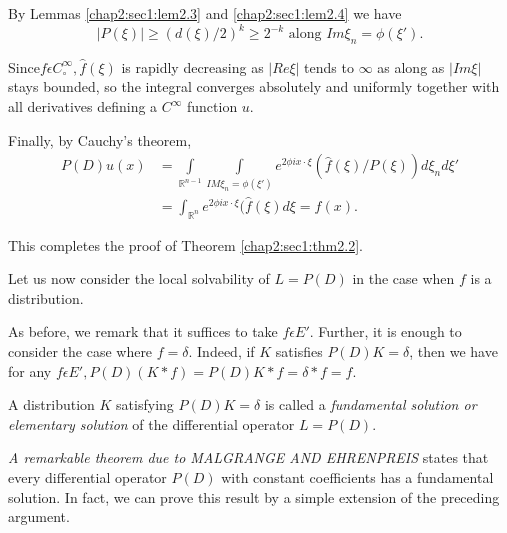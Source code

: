 By Lemmas \ref{chap2:sec1:lem2.3} and \ref{chap2:sec1:lem2.4} we have 
$$
|P(\xi) | \geq (d(\xi)/2)^k \geq 2^{-k} \text{ along } Im \xi_n = \phi (\xi').
$$

Since\pageoriginale $f \epsilon C^{\infty}_\circ, \hat{f}(\xi)$ is rapidly
decreasing as $|Re \xi|$ tends to $\infty$ as along as $|Im \xi|$
stays bounded, so the integral converges absolutely and uniformly
together with all derivatives defining a $C^{\infty}$ function $u$. 

Finally, by Cauchy's theorem,
\begin{align*}
P(D) u(x) & = \int\limits_{\mathbb{R}^{n-1}} \int\limits_{ IM \xi_n = \phi
  (\xi')} e^{2 \phi i x\cdot \xi }(\hat{f}(\xi) /P (\xi)) d \xi_n d
\xi'\\ 
& = \int_{\mathbb{R}^n} e^{2 \phi i x\cdot \xi }(\hat{f}(\xi) d \xi = f(x).
\end{align*}

This completes the proof of Theorem \ref{chap2:sec1:thm2.2}.

Let us now consider the local solvability of $L=P(D)$ in the case when
$f$ is a distribution. 

As before, we remark that it suffices to take $f \epsilon
E'$. Further, it is enough to consider the case where $f =
\delta$. Indeed, if $K$ satisfies $P(D) K = \delta$, then we have for
any $f \epsilon E', P(D) (K*f) = P(D)K*f = \delta * f =f $. 

\setcounter{defi}{4}
\begin{defi} \label{chap2:sec1:def2.5}%
  A distribution $K$ satisfying $P(D)K = \delta$ is called a \textit{
    fundamental solution or elementary solution } of the differential
  operator $L =P(D)$. 
\end{defi}
 
\textit{ A remarkable theorem due to MALGRANGE AND EHRENPREIS } states
that every differential operator $P(D)$ with constant coefficients has
a fundamental solution. In fact, we can prove this result by a simple
extension of the preceding argument. 


